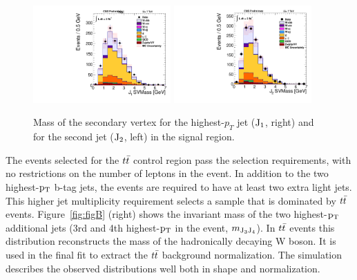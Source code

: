 \begin{figure}
\centering
\includegraphics[width=0.47\textwidth]{Wbb/fig1a_J1Mass.pdf}
\includegraphics[width=0.47\textwidth]{Wbb/fig1a_J2Mass.pdf}
\caption{Mass of the secondary vertex for the highest-$p_{T}$ jet ($\rm{J_{1}}$, right) and for the second jet ($\rm{J_{2}}$, left) in the signal region.}
\label{fig:figAbis}
\end{figure}

The events selected for the $t\bar{t}$ control region pass the selection requirements, with
no restrictions on the number of leptons in the event. 
In addition to the two highest-$\mathrm{p_{T}}$ b-tag jets, the events are required to have at least two extra light jets.
This higher jet multiplicity requirement selects a sample that is dominated by $t\bar{t}$ events.
Figure~\ref{fig:figB} (right) shows the invariant mass of the 
two highest-$\mathrm{p_{T}}$ additional jets (3rd and 4th highest-$\mathrm{p_{T}}$ in the event, $m_{\rm{J_{3}J_{4}}}$). 
In $t\bar{t}$ events this distribution reconstructs the mass of the hadronically decaying W boson. 
It is used in the final fit to extract the $t\bar{t}$ background normalization.
The simulation describes the observed distributions well both in 
shape and normalization.

